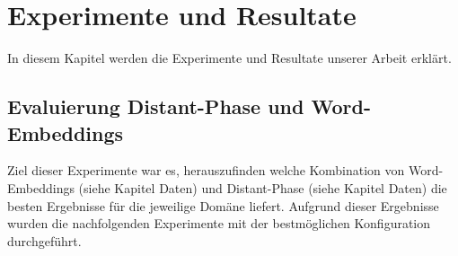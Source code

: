 \chapter{Experimente und Resultate}
In diesem Kapitel werden die Experimente und Resultate unserer Arbeit erklärt.
\section{Evaluierung Distant-Phase und Word-Embeddings}
Ziel dieser Experimente war es, herauszufinden welche Kombination von Word-Embeddings (siehe Kapitel Daten) und Distant-Phase (siehe Kapitel Daten) die besten Ergebnisse für die jeweilige Domäne liefert. Aufgrund dieser Ergebnisse wurden die nachfolgenden Experimente mit der bestmöglichen Konfiguration durchgeführt.
